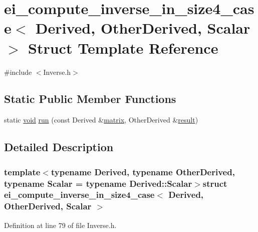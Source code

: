 \hypertarget{structei__compute__inverse__in__size4__case}{\section{ei\-\_\-compute\-\_\-inverse\-\_\-in\-\_\-size4\-\_\-case$<$ Derived, Other\-Derived, Scalar $>$ Struct Template Reference}
\label{structei__compute__inverse__in__size4__case}
}


{\ttfamily \#include $<$Inverse.\-h$>$}

\subsection*{Static Public Member Functions}
\begin{DoxyCompactItemize}
\item 
static \hyperlink{group___u_a_v_objects_plugin_ga444cf2ff3f0ecbe028adce838d373f5c}{void} \hyperlink{structei__compute__inverse__in__size4__case_a590c5bf485558cc3640faa514d1df8fa}{run} (const Derived \&\hyperlink{glext_8h_a7b24a3f2f56eb1244ae69dacb4fecb6f}{matrix}, Other\-Derived \&\hyperlink{qxtslotjob_8h_aab161efab0511ea9612b64c40e9852ca}{result})
\end{DoxyCompactItemize}


\subsection{Detailed Description}
\subsubsection*{template$<$typename Derived, typename Other\-Derived, typename Scalar = typename Derived\-::\-Scalar$>$struct ei\-\_\-compute\-\_\-inverse\-\_\-in\-\_\-size4\-\_\-case$<$ Derived, Other\-Derived, Scalar $>$}



Definition at line 79 of file Inverse.\-h.



